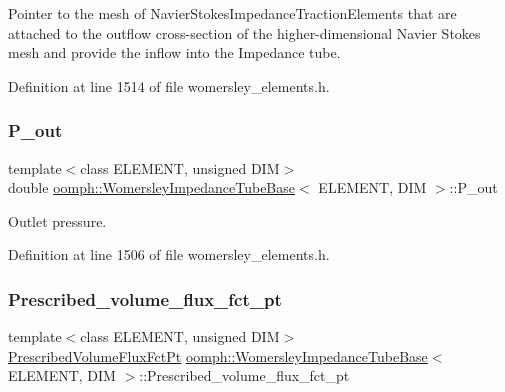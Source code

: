 Pointer to the mesh of Navier\+Stokes\+Impedance\+Traction\+Elements that are attached to the outflow cross-\/section of the higher-\/dimensional Navier Stokes mesh and provide the inflow into the Impedance tube. 



Definition at line 1514 of file womersley\+\_\+elements.\+h.

\mbox{\label{classoomph_1_1WomersleyImpedanceTubeBase_afa4f6e203c33d02e82a92986b1aeee0d}} 
\subsubsection{\texorpdfstring{P\+\_\+out}{P\_out}}
{\footnotesize\ttfamily template$<$class E\+L\+E\+M\+E\+NT, unsigned D\+IM$>$ \\
double \hyperlink{classoomph_1_1WomersleyImpedanceTubeBase}{oomph\+::\+Womersley\+Impedance\+Tube\+Base}$<$ E\+L\+E\+M\+E\+NT, D\+IM $>$\+::P\+\_\+out\hspace{0.3cm}{\ttfamily [protected]}}



Outlet pressure. 



Definition at line 1506 of file womersley\+\_\+elements.\+h.

\mbox{\label{classoomph_1_1WomersleyImpedanceTubeBase_ae7d57d4ab999bc30db552a265fbadf92}} 
\subsubsection{\texorpdfstring{Prescribed\+\_\+volume\+\_\+flux\+\_\+fct\+\_\+pt}{Prescribed\_volume\_flux\_fct\_pt}}
{\footnotesize\ttfamily template$<$class E\+L\+E\+M\+E\+NT, unsigned D\+IM$>$ \\
\hyperlink{classoomph_1_1WomersleyImpedanceTubeBase_a329107c12ef8f97c5afd4e0ae5d67b70}{Prescribed\+Volume\+Flux\+Fct\+Pt} \hyperlink{classoomph_1_1WomersleyImpedanceTubeBase}{oomph\+::\+Womersley\+Impedance\+Tube\+Base}$<$ E\+L\+E\+M\+E\+NT, D\+IM $>$\+::Prescribed\+\_\+volume\+\_\+flux\+\_\+fct\+\_\+pt\hspace{0.3cm}{\ttfamily [protected]}}



